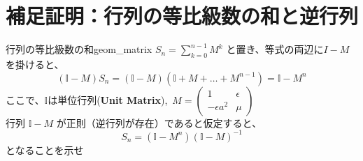\documentclass[dvipdfmx,a4paper,11pt]{jsarticle}
\begin{document}
\newpage
\appendix
\section{補足証明：行列の等比級数の和と逆行列}\label{app:inverse}

\begin{reidai}{行列の等比級数の和}{geom_matrix}
$S_n = \displaystyle\sum_{k=0}^{n-1} M^k$ と置き、等式の両辺に$I - M$を掛けると、
\[
(\mathbb{I} - M) S_n = (\mathbb{I} - M)(\mathbb{I} + M + \dots + M^{n-1}) = \mathbb{I} - M^n
\]
ここで、$\mathbb{I}$は単位行列(\textbf{Unit Matrix}),\ $M = \begin{pmatrix} 1 & \epsilon \\ -\epsilon a^2 & \mu \end{pmatrix}$\\
行列 $\mathbb{I}-M$ が正則（逆行列が存在）であると仮定すると、
\[ S_n = (\mathbb{I} - M^n)(\mathbb{I} - M)^{-1} \]
となることを示せ
\end{reidai}
\vspace{0.5em}
\end{document}
